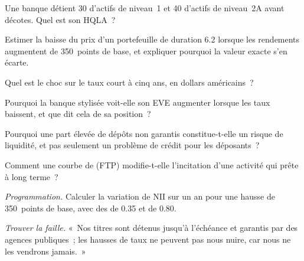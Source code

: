 \begin{exercise}[$\star$]\label{exo:rc:liquidity-and-funding-risk-bank-treasury:1}
Une banque détient 30 d'actifs de niveau~1 et 40 d'actifs de niveau~2A avant décotes. Quel est son HQLA~?
\end{exercise}

\begin{exercise}[$\star$]\label{exo:rc:liquidity-and-funding-risk-bank-treasury:2}
Estimer la baisse du prix d'un portefeuille de duration 6.2 lorsque les rendements augmentent de 350~points de base, et
expliquer pourquoi la valeur exacte s'en écarte.
\end{exercise}

\begin{exercise}[$\star$]\label{exo:rc:liquidity-and-funding-risk-bank-treasury:3}
Quel est le choc sur le taux court à cinq ans, en dollars américains~?
\end{exercise}

\begin{exercise}[$\star\star$]\label{exo:rc:liquidity-and-funding-risk-bank-treasury:4}
Pourquoi la banque stylisée voit-elle son EVE augmenter lorsque les taux baissent, et que dit cela de sa position~?
\end{exercise}

\begin{exercise}[$\star\star$]\label{exo:rc:liquidity-and-funding-risk-bank-treasury:5}
Pourquoi une part élevée de dépôts non garantis constitue-t-elle un risque de liquidité, et pas seulement un problème de crédit pour les déposants~?
\end{exercise}

\begin{exercise}[$\star\star$]\label{exo:rc:liquidity-and-funding-risk-bank-treasury:6}
Comment une courbe de  (FTP) modifie-t-elle l'incitation d'une activité qui prête à long terme~?
\end{exercise}

\begin{exercise}[$\star\star\star$]\label{exo:rc:liquidity-and-funding-risk-bank-treasury:7}
\emph{Programmation.} Calculer la variation de NII sur un an pour une hausse de 350~points de base, avec des  de 0.35
et de 0.80.
\end{exercise}

\begin{exercise}[$\star\star\star$]\label{exo:rc:liquidity-and-funding-risk-bank-treasury:8}
\emph{Trouver la faille.} «~Nos titres sont détenus jusqu'à l'échéance et garantis par des agences publiques~;
les hausses de taux ne peuvent pas nous nuire, car nous ne les vendrons jamais.~»
\end{exercise}

